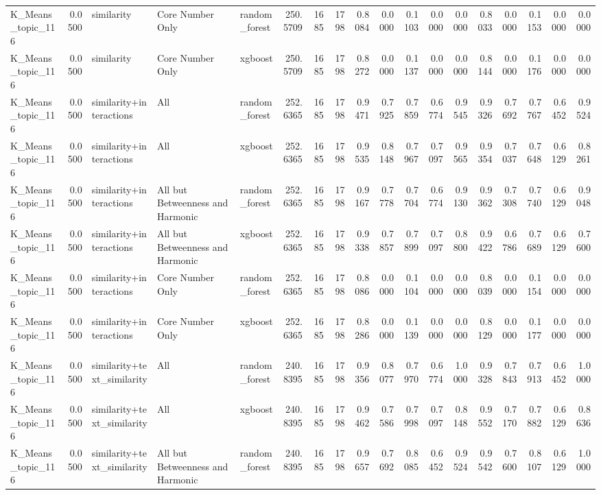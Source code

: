 \begin{tabular}{lrlllrrrrrrrrrrrrr}
K_Means_topic_116 & 0.0500 & similarity & Core Number Only & random_forest & 250.5709 & 1685 & 1798 & 0.8084 & 0.0000 & 0.1103 & 0.0000 & 0.0000 & 0.8033 & 0.0000 & 0.1153 & 0.0000 & 0.0000 \\
K_Means_topic_116 & 0.0500 & similarity & Core Number Only & xgboost & 250.5709 & 1685 & 1798 & 0.8272 & 0.0000 & 0.1137 & 0.0000 & 0.0000 & 0.8144 & 0.0000 & 0.1176 & 0.0000 & 0.0000 \\
K_Means_topic_116 & 0.0500 & similarity+interactions & All & random_forest & 252.6365 & 1685 & 1798 & 0.9471 & 0.7925 & 0.7859 & 0.6774 & 0.9545 & 0.9326 & 0.7692 & 0.7767 & 0.6452 & 0.9524 \\
K_Means_topic_116 & 0.0500 & similarity+interactions & All & xgboost & 252.6365 & 1685 & 1798 & 0.9535 & 0.8148 & 0.7967 & 0.7097 & 0.9565 & 0.9354 & 0.7037 & 0.7648 & 0.6129 & 0.8261 \\
K_Means_topic_116 & 0.0500 & similarity+interactions & All but Betweenness and Harmonic & random_forest & 252.6365 & 1685 & 1798 & 0.9167 & 0.7778 & 0.7704 & 0.6774 & 0.9130 & 0.9362 & 0.7308 & 0.7740 & 0.6129 & 0.9048 \\
K_Means_topic_116 & 0.0500 & similarity+interactions & All but Betweenness and Harmonic & xgboost & 252.6365 & 1685 & 1798 & 0.9338 & 0.7857 & 0.7899 & 0.7097 & 0.8800 & 0.9422 & 0.6786 & 0.7689 & 0.6129 & 0.7600 \\
K_Means_topic_116 & 0.0500 & similarity+interactions & Core Number Only & random_forest & 252.6365 & 1685 & 1798 & 0.8086 & 0.0000 & 0.1104 & 0.0000 & 0.0000 & 0.8039 & 0.0000 & 0.1154 & 0.0000 & 0.0000 \\
K_Means_topic_116 & 0.0500 & similarity+interactions & Core Number Only & xgboost & 252.6365 & 1685 & 1798 & 0.8286 & 0.0000 & 0.1139 & 0.0000 & 0.0000 & 0.8129 & 0.0000 & 0.1177 & 0.0000 & 0.0000 \\
K_Means_topic_116 & 0.0500 & similarity+text_similarity & All & random_forest & 240.8395 & 1685 & 1798 & 0.9356 & 0.8077 & 0.7970 & 0.6774 & 1.0000 & 0.9328 & 0.7843 & 0.7913 & 0.6452 & 1.0000 \\
K_Means_topic_116 & 0.0500 & similarity+text_similarity & All & xgboost & 240.8395 & 1685 & 1798 & 0.9462 & 0.7586 & 0.7998 & 0.7097 & 0.8148 & 0.9552 & 0.7170 & 0.7882 & 0.6129 & 0.8636 \\
K_Means_topic_116 & 0.0500 & similarity+text_similarity & All but Betweenness and Harmonic & random_forest & 240.8395 & 1685 & 1798 & 0.9657 & 0.7692 & 0.8085 & 0.6452 & 0.9524 & 0.9542 & 0.7600 & 0.8107 & 0.6129 & 1.0000 \\

\end{tabular}
